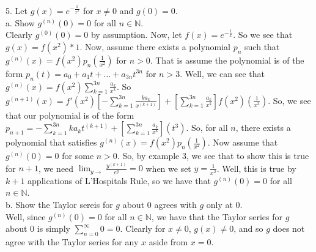 \documentclass[12pt]{article}
\begin{document}
5. Let $g(x)=e^{-\frac{1}{x^2}}$ for $x\neq0$ and $g(0)=0$.\\
a. Show $g^{(n)}(0)=0$ for all $n\in\mathbb{N}$.\\
Clearly $g^{(0)}(0)=0$ by assumption. Now, let $f(x)=e^{-\frac{1}{x}}$. So we see that $g(x)=f(x^2)*1$. Now, assume there exists a polynomial $p_n$ such that $g^{(n)}(x)=f(x^2)p_n(\frac{1}{x^2})$ for $n>0$. That is assume the polynomial is of the form $p_n(t)=a_0+a_1t+...+a_{3n}t^{3n}$ for $n>3$. Well, we can see that $g^{(n)}(x)=f(x^2)\sum_{k=1}^{3n}\frac{a_k}{x^k}$. So $g^{(n+1)}(x)=f'(x^2)[-\sum_{k=1}^{3n}\frac{ka_k}{x^(k+1)}]+[\sum_{k=1}^{3n}\frac{a_k}{x^k}]f(x^2)(\frac{1}{x^3})$. So, we see that our polynomial is of the form $p_{n+1}= -\sum_{k=1}^{3n}ka_kt^{(k+1)}+[\sum_{k=1}^{3n}\frac{a_k}{x^k}](t^3)$. So, for all $n$, there exists a polynomial that satisfies $g^{(n)}(x)=f(x^2)p_n(\frac{1}{x^2})$. Now assume that $g^{(n)}(0)=0$ for some $n>0$. So, by example 3, we see that to show this is true for $n+1$, we need $\lim_{y\rightarrow}\frac{y^{(k+1)}}{e^y}=0$ when we set $y=\frac{1}{x^2}$. Well, this is true by $k+1$ applications of L'Hospitals Rule, so we have that $g^{(n)}(0)=0$ for all $n\in\mathbb{N}$.\\
b. Show the Taylor sereis for $g$ about $0$ agrees with $g$ only at $0$.\\
Well, since $g^{(n)}(0)=0$ for all $n\in\mathbb{N}$, we have that the Taylor series for $g$ about $0$ is simply $\sum_{n=0}^{\infty}0=0$. Clearly for $x\neq0$, $g(x)\neq0$, and so $g$ does not agree with the Taylor series for any $x$ aside from $x=0$.\\[20pt]
\end{document}
